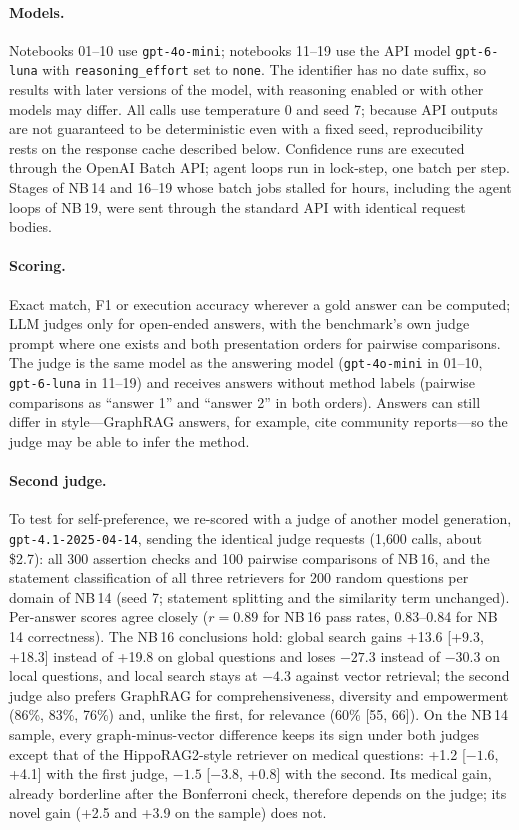 \documentclass[11pt,a4paper]{article}
\newcommand{\nb}[1]{NB\,#1}
\begin{document}
\paragraph{Models.} Notebooks 01--10 use \texttt{gpt-4o-mini}; notebooks 11--19 use the API model \texttt{gpt-6-luna} with
\texttt{reasoning\_effort} set to \texttt{none}. The identifier has no date suffix, so results with later versions of
the model, with reasoning enabled or with other models may differ. All calls use temperature 0 and seed 7; because API outputs are not guaranteed to be
deterministic even with a fixed seed, reproducibility rests on the response cache described below. Confidence runs are executed through the OpenAI
Batch API; agent loops run in lock-step, one batch per step. Stages of \nb{14} and 16--19 whose batch jobs
stalled for hours, including the agent loops of \nb{19}, were sent through the standard API with identical request
bodies.

\paragraph{Scoring.} Exact match, F1 or execution accuracy wherever a gold answer can be computed; LLM judges
only for open-ended answers, with the benchmark's own judge prompt where one exists and both presentation orders
for pairwise comparisons. The judge is the same model as the answering model (\texttt{gpt-4o-mini} in 01--10,
\texttt{gpt-6-luna} in 11--19) and receives answers without method labels (pairwise comparisons as ``answer 1'' and ``answer 2'' in both
orders). Answers can still differ in style---GraphRAG answers, for example, cite community reports---so the judge may
be able to infer the method.

\paragraph{Second judge.} To test for self-preference, we re-scored with a judge of another model generation,
\texttt{gpt-4.1-2025-04-14}, sending the identical judge requests (1{,}600 calls, about \$2.7): all 300 assertion
checks and 100 pairwise comparisons of \nb{16}, and the statement classification of all three retrievers for 200
random questions per domain of \nb{14} (seed 7; statement splitting and the similarity term unchanged). Per-answer
scores agree closely ($r=0.89$ for \nb{16} pass rates, 0.83--0.84 for \nb{14} correctness). The \nb{16} conclusions
hold: global search gains +13.6 [+9.3, +18.3] instead of +19.8 on global questions and loses $-27.3$ instead of
$-30.3$ on local questions, and local search stays at $-4.3$ against vector retrieval; the second judge also prefers
GraphRAG for comprehensiveness, diversity and empowerment (86\%, 83\%, 76\%) and, unlike the first, for relevance
(60\% [55, 66]). On the \nb{14} sample, every graph-minus-vector difference keeps its sign under both judges except
that of the HippoRAG2-style retriever on medical questions: +1.2 [$-1.6$, +4.1] with the first judge, $-1.5$
[$-3.8$, +0.8] with the second. Its medical gain, already borderline after the Bonferroni check, therefore depends on
the judge; its novel gain (+2.5 and +3.9 on the sample) does not.
\end{document}
